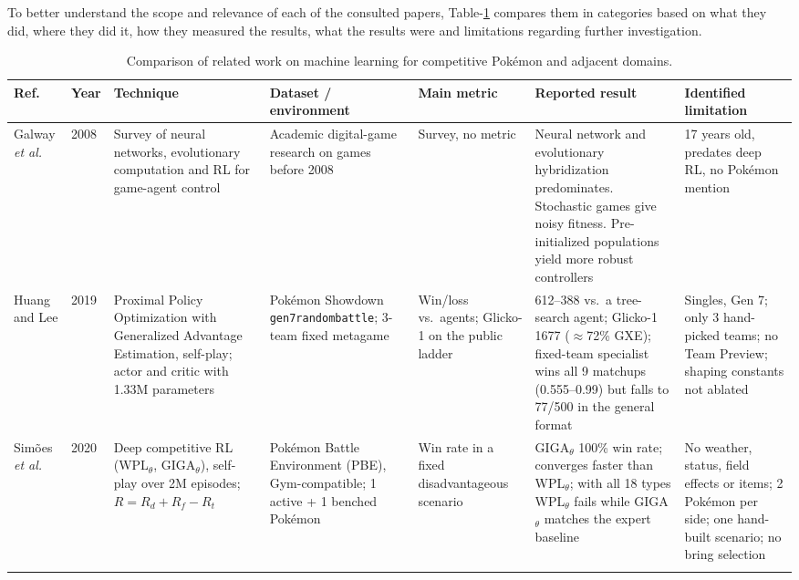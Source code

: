 \documentclass[conference]{IEEEtran}
\begin{document}
To better understand the scope and relevance of each of the consulted papers, Table-\ref{tab:related} compares them in categories based on what they did, where they did it, how they measured the results, what the results were and limitations regarding further investigation.
\begin{table}[!t]
\centering
\caption{Comparison of related work on machine learning for competitive Pok\'emon and adjacent domains.}
\label{tab:related}
\scriptsize
\setlength{\tabcolsep}{3pt}
\renewcommand{\arraystretch}{1.15}
\begin{tabular}{@{}p{1.4cm}p{0.5cm}p{3.0cm}p{2.8cm}p{2.0cm}p{3.5cm}p{3.3cm}@{}}
\toprule
\textbf{Ref.} & \textbf{Year} & \textbf{Technique} & \textbf{Dataset / environment} & \textbf{Main metric} & \textbf{Reported result} & \textbf{Identified limitation} \\
\midrule

Galway \emph{et al.} \cite{galway2008} & 2008 &
Survey of neural networks, evolutionary computation and RL for game-agent control &
Academic digital-game research on games before 2008 &
Survey, no metric &
Neural network and evolutionary hybridization predominates. Stochastic games give noisy fitness. Pre-initialized populations yield more robust controllers &
17 years old, predates deep RL, no Pok\'emon mention \\
\addlinespace

Huang and Lee \cite{huang2019} & 2019 &
Proximal Policy Optimization with Generalized Advantage Estimation, self-play; actor and critic with 1.33M parameters &
Pok\'emon Showdown \texttt{gen7randombattle}; 3-team fixed metagame &
Win/loss vs.\ agents; Glicko-1 on the public ladder &
612--388 vs.\ a tree-search agent; Glicko-1 1677 ($\approx$72\% GXE); fixed-team specialist wins all 9 matchups (0.555--0.99) but falls to 77/500 in the general format &
Singles, Gen 7; only 3 hand-picked teams; no Team Preview; shaping constants not ablated \\
\addlinespace

Sim\~oes \emph{et al.} \cite{simoes2020} & 2020 &
Deep competitive RL (WPL$_\theta$, GIGA$_\theta$), self-play over 2M episodes; $R = R_d + R_f - R_t$ &
Pok\'emon Battle Environment (PBE), Gym-compatible; 1 active + 1 benched Pokémon &
Win rate in a fixed disadvantageous scenario &
GIGA$_\theta$ 100\% win rate; converges faster than WPL$_\theta$; with all 18 types WPL$_\theta$ fails while GIGA$_\theta$ matches the expert baseline &
No weather, status, field effects or items; 2 Pok\'emon per side; one hand-built scenario; no bring selection \\
\addlinespace


\end{tabular}
\end{table}
\end{document}
